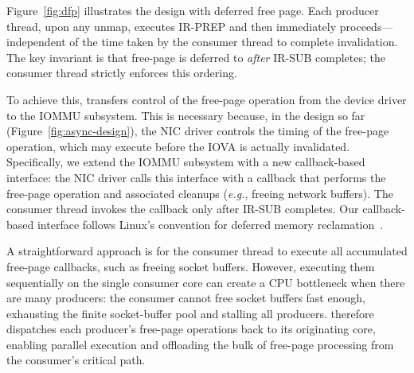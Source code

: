 Figure~\ref{fig:dfp} illustrates the {\name} design with deferred free page.
Each producer thread, upon any unmap, executes IR-PREP and then immediately proceeds---independent of the time taken by the consumer thread to complete invalidation.
The key invariant is that free-page is deferred to {\it after} IR-SUB completes;
the consumer thread strictly enforces this ordering.

To achieve this, {\name} transfers control of the free-page operation from the device driver to the IOMMU subsystem.
This is necessary because, in the design so far (Figure~\ref{fig:async-design}),
the NIC driver controls the timing of the free-page operation, which may execute before the IOVA is actually invalidated.
Specifically, we extend the IOMMU subsystem with a new callback-based  interface:
the NIC driver calls this interface with a callback that performs the free-page operation 
    and associated cleanups (\textit{e.g.}, freeing network buffers).
The consumer thread invokes the callback only after IR-SUB completes.
Our callback-based interface follows Linux's  convention for deferred memory 
    reclamation~\cite{linux_rcu,linux_ma_free_rcu, linux_kfence_free, linux_tlb_remove_table_free}.

A straightforward approach is for the consumer thread to execute all accumulated free-page callbacks,
    such as freeing socket buffers.
However, executing them sequentially on the single consumer core can create a CPU bottleneck
    when there are many producers:
the consumer cannot free socket buffers fast enough, exhausting the finite socket-buffer pool and stalling all producers.
\brand therefore dispatches each producer's free-page operations back to its originating core,
enabling parallel execution and offloading the bulk of free-page processing from the consumer's critical path.

